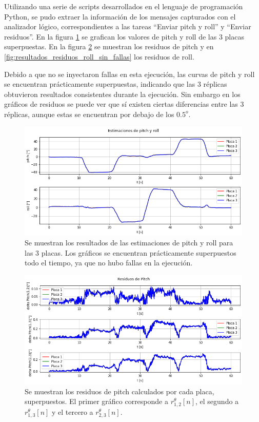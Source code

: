 Utilizando una serie de scripts desarrollados en el lenguaje de programación Python, se pudo extraer la información de los mensajes capturados con el analizador lógico, correspondientes a las tareas ``Enviar pitch y roll'' y ``Enviar residuos''. En la figura \ref{fig:resultados_pitch_roll_sin_fallas} se grafican los valores de pitch y roll de las 3 placas superpuestas. En la figura \ref{fig:resultados_residuos_pitch_sin_fallas} se muestran los residuos de pitch y en \ref{fig:resultados_residuos_roll_sin_fallas} los residuos de roll.

Debido a que no se inyectaron fallas en esta ejecución, las curvas de pitch y roll se encuentran prácticamente superpuestas, indicando que las 3 réplicas obtuvieron resultados consistentes durante la ejecución. Sin embargo en los gráficos de residuos se puede ver que sí existen ciertas diferencias entre las 3 réplicas, aunque estas se encuentran por debajo de los $0.5^{o}$.

\begin{figure}[H]
    \centering
    \includegraphics[width=\textwidth]{img/resultados_pitch_roll_sin_fallas.png}
    \caption{Se muestran los resultados de las estimaciones de pitch y roll para las 3 placas. Los gráficos se encuentran prácticamente superpuestos todo el tiempo, ya que no hubo fallas en la ejecución.}
    \label{fig:resultados_pitch_roll_sin_fallas}
\end{figure}

\begin{figure}[H]
    \centering
    \includegraphics[width=\textwidth]{img/resultados_residuos_pitch_sin_fallas.png}
    \caption{Se muestran los residuos de pitch calculados por cada placa, superpuestos. El primer gráfico corresponde a $r_{1,2}^{\theta}[n]$, el segundo a $r_{1,3}^{\theta}[n]$ y el tercero a $r_{2,3}^{\theta}[n]$.}
    \label{fig:resultados_residuos_pitch_sin_fallas}    
\end{figure}

